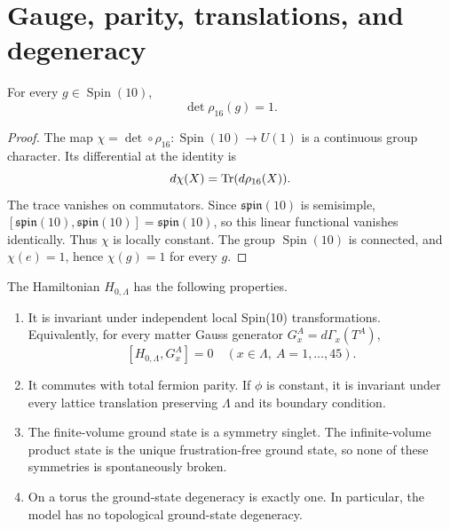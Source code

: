 \section{Gauge, parity, translations, and degeneracy}

\begin{lemma}
\label{lem:det}
For every $g\in\operatorname{Spin}(10)$,
\[
 \det\rho_{16}(g)=1.
\tag{3.1}\label{eq:detone}
\]
\end{lemma}

\begin{proof}
The map $\chi=\det\circ\rho_{16}:
\operatorname{Spin}(10)\to U(1)$ is a continuous group character.
Its differential at the identity is
\[
 d\chi(X)=\operatorname{Tr}(d\rho_{16}(X)).
\]
The trace vanishes on commutators.  Since
$\mathfrak{spin}(10)$ is semisimple,
$[\mathfrak{spin}(10),\mathfrak{spin}(10)]
=\mathfrak{spin}(10)$, so this linear functional vanishes identically.
Thus $\chi$ is locally constant.  The group $\operatorname{Spin}(10)$
is connected, and $\chi(e)=1$, hence $\chi(g)=1$ for every $g$.
\end{proof}

\begin{theorem}
\label{thm:T2}
The Hamiltonian $H_{0,\Lambda}$ has the following properties.
\begin{enumerate}[label=\textup{(\alph*)}]
\item It is invariant under independent local Spin(10) transformations.
Equivalently, for every matter Gauss generator
$G_x^A=d\Gamma_x(T^A)$,
\[
 [H_{0,\Lambda},G_x^A]=0
 \quad(x\in\Lambda,\ A=1,\ldots,45).
\tag{3.2}\label{eq:gauss}
\]
\item It commutes with total fermion parity.  If $\phi$ is constant,
it is invariant under every lattice translation preserving $\Lambda$
and its boundary condition.
\item The finite-volume ground state is a symmetry singlet.  The
infinite-volume product state is the unique frustration-free ground
state, so none of these symmetries is spontaneously broken.
\item On a torus the ground-state degeneracy is exactly one.  In
particular, the model has no topological ground-state degeneracy.
\end{enumerate}
\end{theorem}

